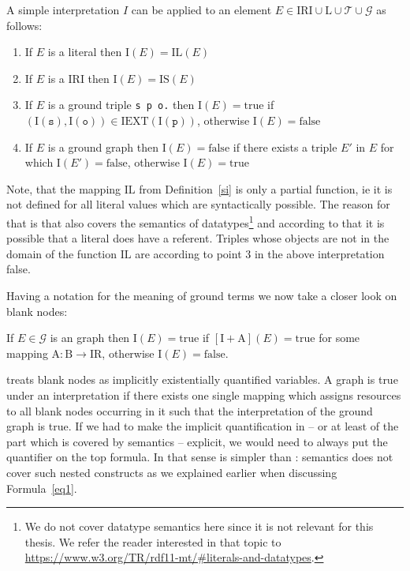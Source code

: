 \begin{definition}
A simple interpretation $I$ can be applied to an element $E\in \mathrm{IRI}\cup\mathrm{L}\cup\mathcal{T}\cup\mathcal{G}$ as follows: 
\begin{enumerate}
 \item If $E$ is a literal then $\mathrm{I}(E)=\mathrm{IL}(E)$
 \item If $E$ is a IRI then $\mathrm{I}(E)=\mathrm{IS}(E)$
 \item If $E$ is a ground triple \texttt{s p o.} then $ \mathrm{I}(E)=\text{true}$ if $(\mathrm{I}(\texttt{s}), \mathrm{I}(\texttt{o}))\in \mathrm{IEXT}(\mathrm{I}(\texttt{p}))$, otherwise 
 $\mathrm{I}(E)=\text{false}$
 \item If $E$ is a ground graph then $\mathrm{I}(E)=\text{false}$ if there exists a triple $E'$ in $E$ for which $\mathrm{I}(E')=\text{false}$, otherwise $\mathrm{I}(E)=\text{true}$ 
 \end{enumerate}
\end{definition}
Note, that the mapping $\mathrm{IL}$ from Definition~\ref{si} is only a partial function, ie it is not defined for all literal values which are syntactically possible. 
The reason for that is that \rdf also covers the semantics of datatypes\footnote{We do not cover datatype semantics here since it is not relevant for this thesis. We refer the reader interested in that topic 
to \url{https://www.w3.org/TR/rdf11-mt/\#literals-and-datatypes}.} and according to that it is possible that a literal does have a referent. 
Triples whose objects are not in the domain of the function $\mathrm{IL}$ are according to point 3 in the above interpretation false.

Having a notation for the meaning of ground terms we now take a closer look on blank nodes: %
\begin{definition}\label{rdfbl}
 If $E\in \mathcal{G}$ is an \rdf graph then  $\mathrm{I}(E)=\text{true}$ if $[\mathrm{I}+\mathrm{A}](E)=\text{true}$ for some mapping $\mathrm{A}: \mathrm{B} \rightarrow \mathrm{IR}$, 
 otherwise $\mathrm{I}(E)=\text{false}$.
\end{definition}
\rdf treats blank nodes as implicitly existentially quantified variables. 
A graph is true under an interpretation if there exists one single mapping which assigns resources to all blank nodes occurring in it such that the interpretation of 
the ground graph is true. If we had to make the implicit quantification in \rdf{} -- or at least of the part which is covered by \rdf semantics -- explicit, we would need to 
always put the quantifier on the top formula. In that sense \rdf is simpler than \nthree: \rdf semantics does not cover such nested constructs as we explained earlier when 
discussing Formula~\ref{eq1}.

